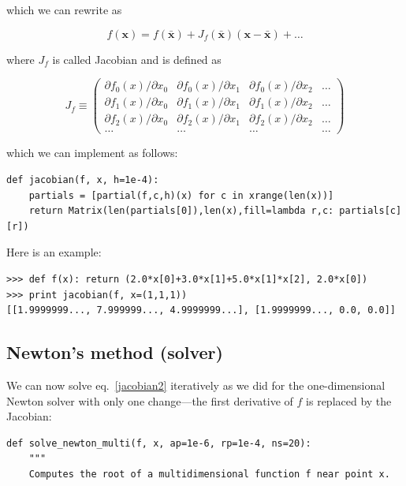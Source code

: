 \documentclass[justified,sixbynine]{tufte-book}
\def\ft{\small\tt}
\theoremstyle{plain}%
\theoremstyle{definition}
\theoremstyle{remark}
\begin{document}
\begin{fullwidth}
which we can rewrite as

\begin{equation}
f(\mathbf{x}) = f(\mathbf{\bar x}) + J_f(\mathbf{\bar x})(\mathbf{x}-\mathbf{\bar x}) + \dots \label{jacobian2}
\end{equation}

where $J_f$ is called Jacobian and is defined as

\begin{equation}
J_f \equiv
\begin{pmatrix}
\partial f_0(x)/\partial x_0 &
\partial f_0(x)/\partial x_1 &
\partial f_0(x)/\partial x_2 &
\dots \\
\partial f_1(x)/\partial x_0 &
\partial f_1(x)/\partial x_1 &
\partial f_1(x)/\partial x_2 &
\dots \\
\partial f_2(x)/\partial x_0 &
\partial f_2(x)/\partial x_1 &
\partial f_2(x)/\partial x_2 &
\dots \\
\dots & \dots & \dots &\dots 
\end{pmatrix}
\end{equation}

which we can implement as follows:

\begin{lstlisting}[caption={in file: {\ft nlib.py}}]
def jacobian(f, x, h=1e-4):
    partials = [partial(f,c,h)(x) for c in xrange(len(x))]
    return Matrix(len(partials[0]),len(x),fill=lambda r,c: partials[c][r])
\end{lstlisting}

Here is an example:

\begin{lstlisting}[caption={in file: {\ft nlib.py}}]
>>> def f(x): return (2.0*x[0]+3.0*x[1]+5.0*x[1]*x[2], 2.0*x[0])
>>> print jacobian(f, x=(1,1,1))
[[1.9999999..., 7.999999..., 4.9999999...], [1.9999999..., 0.0, 0.0]]
\end{lstlisting}

\goodbreak\subsection{Newton's method (solver)}


We can now solve eq.~\ref{jacobian2} iteratively as we did for the one-dimensional Newton solver with only one change---the first derivative of $f$ is replaced by the Jacobian:

\begin{lstlisting}[caption={in file: {\ft nlib.py}}]
def solve_newton_multi(f, x, ap=1e-6, rp=1e-4, ns=20):
    """
    Computes the root of a multidimensional function f near point x.


\end{lstlisting}
\end{fullwidth}
\end{document}

